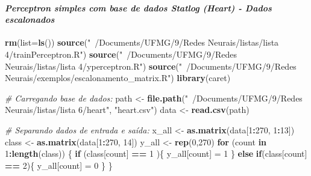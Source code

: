 \documentclass[
]{article}
\newenvironment{Shaded}{\begin{snugshade}}{\end{snugshade}}
\newcommand{\CommentTok}[1]{\textcolor[rgb]{0.56,0.35,0.01}{\textit{#1}}}
\newcommand{\ControlFlowTok}[1]{\textcolor[rgb]{0.13,0.29,0.53}{\textbf{#1}}}
\newcommand{\DataTypeTok}[1]{\textcolor[rgb]{0.13,0.29,0.53}{#1}}
\newcommand{\DecValTok}[1]{\textcolor[rgb]{0.00,0.00,0.81}{#1}}
\newcommand{\KeywordTok}[1]{\textcolor[rgb]{0.13,0.29,0.53}{\textbf{#1}}}
\newcommand{\NormalTok}[1]{#1}
\newcommand{\OperatorTok}[1]{\textcolor[rgb]{0.81,0.36,0.00}{\textbf{#1}}}
\newcommand{\StringTok}[1]{\textcolor[rgb]{0.31,0.60,0.02}{#1}}
\begin{document}
\hypertarget{perceptron-simples-com-base-de-dados-statlog-heart---dados-escalonados}{%
\paragraph{\texorpdfstring{\textbf{\emph{Perceptron simples com base de
dados Statlog (Heart) - Dados
escalonados}}}{Perceptron simples com base de dados Statlog (Heart) - Dados escalonados}}\label{perceptron-simples-com-base-de-dados-statlog-heart---dados-escalonados}}

\begin{Shaded}
\begin{Highlighting}[]
\KeywordTok{rm}\NormalTok{(}\DataTypeTok{list=}\KeywordTok{ls}\NormalTok{())}
\KeywordTok{source}\NormalTok{(}\StringTok{"~/Documents/UFMG/9/Redes Neurais/listas/lista 4/trainPerceptron.R"}\NormalTok{)}
\KeywordTok{source}\NormalTok{(}\StringTok{"~/Documents/UFMG/9/Redes Neurais/listas/lista 4/yperceptron.R"}\NormalTok{)}
\KeywordTok{source}\NormalTok{(}\StringTok{"~/Documents/UFMG/9/Redes Neurais/exemplos/escalonamento_matrix.R"}\NormalTok{)}
\KeywordTok{library}\NormalTok{(caret)}

\CommentTok{# Carregando base de dados:}
\NormalTok{path <-}\StringTok{ }\KeywordTok{file.path}\NormalTok{(}\StringTok{"~/Documents/UFMG/9/Redes Neurais/listas/lista 6/heart"}\NormalTok{, }\StringTok{"heart.csv"}\NormalTok{)}
\NormalTok{data <-}\StringTok{ }\KeywordTok{read.csv}\NormalTok{(path)}

\CommentTok{# Separando dados de entrada e saída:}
\NormalTok{x_all <-}\StringTok{ }\KeywordTok{as.matrix}\NormalTok{(data[}\DecValTok{1}\OperatorTok{:}\DecValTok{270}\NormalTok{, }\DecValTok{1}\OperatorTok{:}\DecValTok{13}\NormalTok{])}
\NormalTok{class <-}\StringTok{ }\KeywordTok{as.matrix}\NormalTok{(data[}\DecValTok{1}\OperatorTok{:}\DecValTok{270}\NormalTok{, }\DecValTok{14}\NormalTok{])}
\NormalTok{y_all <-}\StringTok{ }\KeywordTok{rep}\NormalTok{(}\DecValTok{0}\NormalTok{,}\DecValTok{270}\NormalTok{)}
\ControlFlowTok{for}\NormalTok{ (count }\ControlFlowTok{in} \DecValTok{1}\OperatorTok{:}\KeywordTok{length}\NormalTok{(class)) \{}
  \ControlFlowTok{if}\NormalTok{ (class[count] }\OperatorTok{==}\StringTok{ }\DecValTok{1}\NormalTok{ )\{}
\NormalTok{    y_all[count] =}\StringTok{ }\DecValTok{1}
\NormalTok{  \}}
  \ControlFlowTok{else} \ControlFlowTok{if}\NormalTok{(class[count] }\OperatorTok{==}\StringTok{ }\DecValTok{2}\NormalTok{)\{}
\NormalTok{    y_all[count] =}\StringTok{ }\DecValTok{0}
\NormalTok{  \}}
\NormalTok{\}}


\end{Highlighting}
\end{Shaded}
\end{document}
